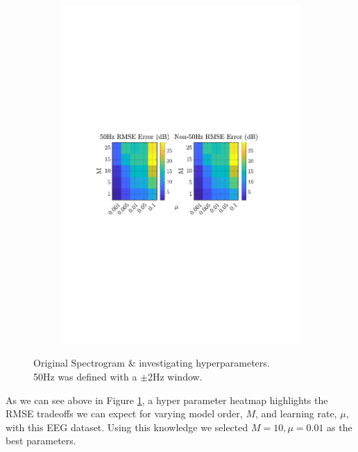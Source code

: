 \documentclass[12pt]{article}
\begin{document}
\begin{figure}[H]
\begin{subfigure}{0.49\textwidth}
					\includegraphics[trim={2.8cm 11.2cm 3.00cm  11.2cm}, clip, width=\textwidth]{../MATLAB/figures/q2_3d_fig06.pdf} 
					\captionsetup{justification=centering}
				\end{subfigure}
				
				\captionsetup{justification=centering}
				\caption{ Original Spectrogram \& investigating hyperparameters. \\
						  50Hz was defined with a $\pm$2Hz window. }
				\label{fig: 2-3d-orig+paramSweep}
			\end{figure}
		
			As we can see above in Figure \ref{fig: 2-3d-orig+paramSweep}, a hyper parameter heatmap highlights the RMSE tradeoffs we can expect for varying model order, $M$, and learning rate, $\mu$, with this EEG dataset. Using this knowledge we selected $M=10,\mu=0.01$ as the best parameters. 
			
\end{document}
